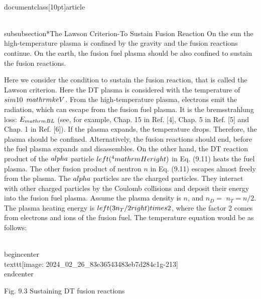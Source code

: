 \\documentclass[10pt]{article}
\begin{document}
{{{{{{\\subsubsection*{The Lawson Criterion-To Sustain Fusion Reaction}
On the sun the high-temperature plasma is confined by the gravity and the fusion reactions continue. On the earth, the fusion fuel plasma should be also confined to sustain the fusion reactions.

Here we consider the condition to sustain the fusion reaction, that is called the Lawson criterion. Here the DT plasma is considered with the temperature of $\\sim 10$ $\\mathrm{keV}$. From the high-temperature plasma, electrons emit the radiation, which can escape from the fusion fuel plasma. It is the bremsstrahlung loss: $E_{\\mathrm{BL}}$ (see, for example, Chap. 15 in Ref. [4], Chap. 5 in Ref. [5] and Chap. 1 in Ref. [6]). If the plasma expands, the temperature drops. Therefore, the plasma should be confined. Alternatively, the fusion reactions should end, before the fuel plasma expands and disassembles. On the other hand, the DT reaction product of the $\\alpha$ particle $\\left({ }^{4} \\mathrm{He}\\right)$ in Eq. (9.11) heats the fuel plasma. The other fusion product of neutron $n$ in Eq. (9.11) escapes almost freely from the plasma. The $\\alpha$ particles are the charged particles. They interact with other charged particles by the Coulomb collisions and deposit their energy into the fusion fuel plasma. Assume the plasma density is $n$, and $n_{D}=$ $n_{T}=n / 2$. The plasma heating energy is $\\left(3 n_{T} / 2\\right) \\times 2$, where the factor 2 comes from electrons and ions of the fusion fuel. The temperature equation would be as follows:

\\begin{center}
\\texttt{[image: 2024\_02\_26\_83e36543483eb7d284c1g-213]}
\\end{center}

Fig. 9.3 Sustaining DT fusion reactions


}}}}}}
\end{document}
